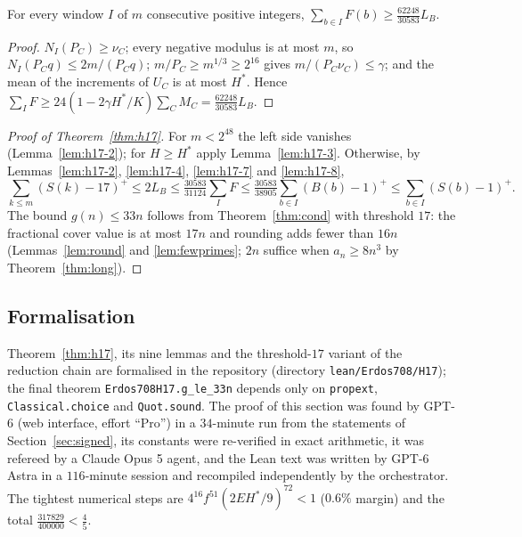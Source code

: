 \begin{lemma}\label{lem:h17-8}
For every window $I$ of $m$ consecutive positive integers, $\sum_{b\in I}F(b)\ge\tfrac{62248}{30583}L_B$.
\end{lemma}
\begin{proof}
$N_I(P_C)\ge\nu_C$; every negative modulus is at most $m$, so $N_I(P_Cq)\le2m/(P_Cq)$; $m/P_C\ge m^{1/3}\ge2^{16}$ gives
$m/(P_C\nu_C)\le\gamma$; and the mean of the increments of $U_C$ is at most $H^*$. Hence
$\sum_IF\ge24(1-2\gamma H^*/K)\sum_CM_C=\tfrac{62248}{30583}L_B$.
\end{proof}

\begin{proof}[Proof of Theorem~\ref{thm:h17}]
For $m<2^{48}$ the left side vanishes (Lemma~\ref{lem:h17-2}); for $H\ge H^*$ apply Lemma~\ref{lem:h17-3}. Otherwise, by
Lemmas~\ref{lem:h17-2}, \ref{lem:h17-4}, \ref{lem:h17-7} and \ref{lem:h17-8},
\[
\sum_{k\le m}(S(k)-17)^+\le2L_B\le\tfrac{30583}{31124}\sum_IF\le\tfrac{30583}{38905}\sum_{b\in I}(B(b)-1)^+\le\sum_{b\in I}(S(b)-1)^+ .
\]
The bound $g(n)\le33n$ follows from Theorem~\ref{thm:cond} with threshold $17$: the fractional cover value is at most $17n$
and rounding adds fewer than $16n$ (Lemmas~\ref{lem:round} and \ref{lem:fewprimes}; $2n$ suffice when $a_n\ge8n^3$ by
Theorem~\ref{thm:long}).
\end{proof}

\subsection*{Formalisation}
Theorem~\ref{thm:h17}, its nine lemmas and the threshold-$17$ variant of the reduction chain are formalised in the repository
(directory \texttt{lean/Erdos708/H17}); the final theorem \texttt{Erdos708H17.g\_le\_33n} depends only on \texttt{propext},
\texttt{Classical.choice} and \texttt{Quot.sound}. The proof of this section was found by GPT-6 (web interface, effort ``Pro'')
in a $34$-minute run from the statements of Section~\ref{sec:signed}, its constants were re-verified in exact arithmetic,
it was refereed by a Claude Opus 5 agent, and the Lean text was written by GPT-6 Astra in a $116$-minute session and recompiled
independently by the orchestrator. The tightest numerical steps are $4^{16}f^{51}(2EH^*/9)^{72}<1$ ($0.6\%$ margin) and the total
$\tfrac{317829}{400000}<\tfrac45$.
